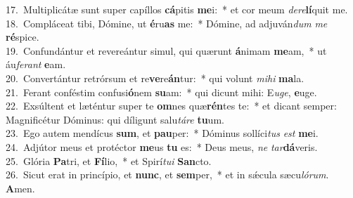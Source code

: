 {17.~}Multiplicátæ sunt super capíllos \textbf{cá}pitis \textbf{me}i:~* et cor meum \textit{de}\textit{re}\textbf{lí}quit me.\\
{18.~}Compláceat tibi, Dómine, ut \textbf{é}ru\textbf{as} me:~* Dómine, ad adjuván\textit{dum} \textit{me} \textbf{ré}spice.\\
{19.~}Confundántur et revereántur simul, qui quærunt \textbf{á}nimam \textbf{me}am,~* ut áu\textit{fe}\textit{rant} \textbf{e}am.\\
{20.~}Convertántur retrórsum et re\textbf{ve}re\textbf{án}tur:~* qui volunt \textit{mi}\textit{hi} \textbf{ma}la.\\
{21.~}Ferant conféstim confusi\textbf{ó}nem \textbf{su}am:~* qui dicunt mihi: E\textit{u}\textit{ge}, \textbf{e}uge.\\
{22.~}Exsúltent et læténtur super te \textbf{om}nes quæ\textbf{rén}tes te:~* et dicant semper: Magnificétur Dóminus: qui díligunt salu\textit{tá}\textit{re} \textbf{tu}um.\\
{23.~}Ego autem mendícus \textbf{sum}, et \textbf{pau}per:~* Dóminus sollíci\textit{tus} \textit{est} \textbf{me}i.\\
{24.~}Adjútor meus et protéctor \textbf{me}us \textbf{tu} es:~* Deus meus, \textit{ne} \textit{tar}\textbf{dá}veris.\\
{25.~}Glória \textbf{Pa}tri, et \textbf{Fí}lio,~* et Spirí\textit{tu}\textit{i} \textbf{San}cto.\\
{26.~}Sicut erat in princípio, et \textbf{nunc}, et \textbf{sem}per,~* et in sǽcula sæcu\textit{ló}\textit{rum}. \textbf{A}men.\\
